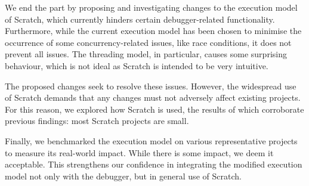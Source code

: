 \documentclass[main]{subfiles}
\begin{document}
We end the part by proposing and investigating changes to the execution model of Scratch, which currently hinders certain debugger-related functionality.
Furthermore, while the current execution model has been chosen to minimise the occurrence of some concurrency-related issues, like race conditions, it does not prevent all issues.
The threading model, in particular, causes some surprising behaviour, which is not ideal as Scratch is intended to be very intuitive.

The proposed changes seek to resolve these issues.
However, the widespread use of Scratch demands that any changes must not adversely affect existing projects.
For this reason, we explored how Scratch is used, the results of which corroborate previous findings: most Scratch projects are small.

Finally, we benchmarked the execution model on various representative projects to measure its real-world impact.
While there is some impact, we deem it acceptable.
This strengthens our confidence in integrating the modified execution model not only with the debugger, but in general use of Scratch.
\end{document}
